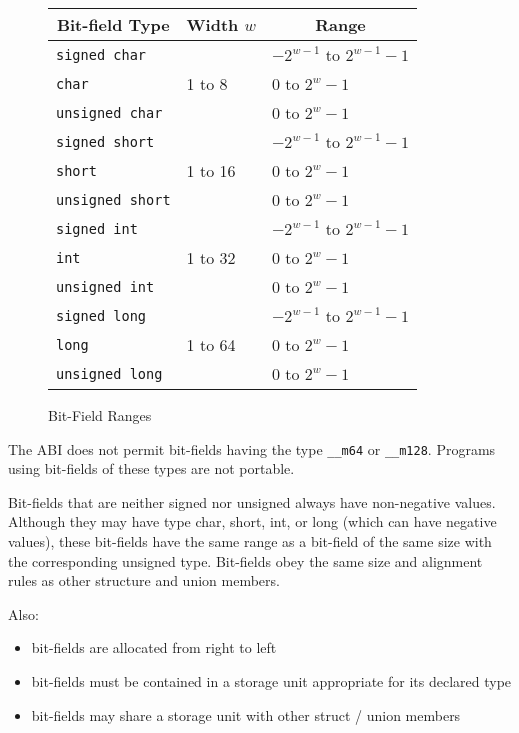 \begin{figure}[h]
\Hrule
  \caption{Bit-Field Ranges}
  \begin{center}
    \leavevmode
    \begin{tabular}{l|l|l}
      \multicolumn{1}{c}{Bit-field Type}
         & \multicolumn{1}{c}{Width $w$}
         & \multicolumn{1}{c}{Range} \\
      \hline
      \texttt{signed char} & & $-2^{w - 1}$ to $2^{w-1}-1$ \\
      \texttt{char} & 1 to 8 & 0 to $2^{w}-1$ \\
      \texttt{unsigned char} & & 0 to $2^{w}-1$ \\
      \hline
      \texttt{signed short} & & $-2^{w - 1}$ to $2^{w-1}-1$ \\
      \texttt{short} & 1 to 16 & 0 to $2^{w}-1$ \\
      \texttt{unsigned short} & & 0 to $2^{w}-1$ \\
      \hline
      \texttt{signed int} & & $-2^{w - 1}$ to $2^{w-1}-1$ \\
      \texttt{int} & 1 to 32 & 0 to $2^{w}-1$ \\
      \texttt{unsigned int} & & 0 to $2^{w}-1$ \\
      \hline
      \texttt{signed long} & & $-2^{w - 1}$ to $2^{w-1}-1$ \\
      \texttt{long} & 1 to 64 & 0 to $2^{w}-1$ \\
      \texttt{unsigned long} & & 0 to $2^{w}-1$ \\
    \end{tabular}
  \end{center}
\Hrule
\end{figure}

The ABI does not permit bit-fields having the type \texttt{__m64} or
\texttt{__m128}.  Programs using bit-fields of these types are not
portable.

Bit-fields that are neither signed nor unsigned
always have non-negative values. Although they may have type char,
short, int, or long (which can have negative values), these bit-fields
have the same range as a bit-field of the same size with the
corresponding unsigned type. Bit-fields obey the same size and
alignment rules as other structure and union members.

Also:
\begin{itemize}
 \item bit-fields are allocated from right to left
 \item bit-fields must be contained in a storage unit appropriate 
       for its declared type
 \item bit-fields may share a storage unit with other struct / union members
\end{itemize}


